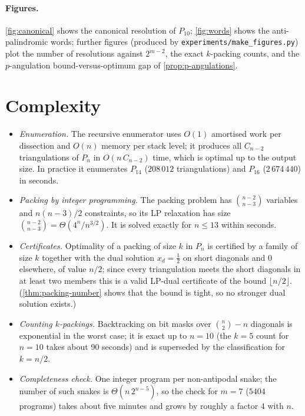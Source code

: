 \documentclass[11pt,a4paper]{article}
\theoremstyle{definition}
\theoremstyle{remark}
\begin{document}
\paragraph{Figures.}  \cref{fig:canonical} shows the canonical resolution of $P_{10}$;
\cref{fig:words} shows the anti-palindromic words; further figures (produced by
\texttt{experiments/make\_figures.py}) plot the number of resolutions against $2^{m-2}$,
the exact $k$-packing counts, and the $p$-angulation bound-versus-optimum gap of
\cref{prop:p-angulations}.

\section{Complexity}

\begin{itemize}
\item \emph{Enumeration.}  The recursive enumerator uses $O(1)$ amortised work per
dissection and $O(n)$ memory per stack level; it produces all $C_{n-2}$ triangulations of
$P_n$ in $O(n\,C_{n-2})$ time, which is optimal up to the output size.  In practice it
enumerates $P_{14}$ ($208\,012$ triangulations) and $P_{16}$ ($2\,674\,440$) in seconds.
\item \emph{Packing by integer programming.}  The packing problem has $\binom{n-2}{n-3}$
variables and $n(n-3)/2$ constraints, so its LP relaxation has size $\binom{n-2}{n-3} =
\Theta(4^n/n^{3/2})$.  It is solved exactly for $n\le13$ within seconds.
\item \emph{Certificates.}  Optimality of a packing of size $k$ in $P_n$ is certified by a
family of size $k$ together with the dual solution $x_d=\tfrac12$ on short diagonals and
$0$ elsewhere, of value $n/2$; since every triangulation meets the short diagonals in at
least two members this is a valid LP-dual certificate of the bound
$\lfloor n/2\rfloor$.  (\cref{thm:packing-number} shows that the bound is tight, so no
stronger dual solution exists.)
\item \emph{Counting $k$-packings.}  Backtracking on bit masks over $\binom{n}{2}-n$
diagonals is exponential in the worst case; it is exact up to $n=10$ (the $k=5$ count for
$n=10$ takes about 90 seconds) and is superseded by the classification for $k=n/2$.
\item \emph{Completeness check.}  One integer program per non-antipodal snake; the number of
such snakes is $\Theta(n\,2^{n-5})$, so the check for $m=7$ ($5404$ programs) takes about
five minutes and grows by roughly a factor $4$ with $n$.
\end{itemize}
\end{document}

